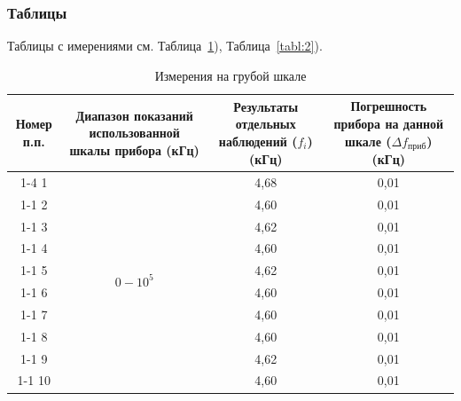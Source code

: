 \subsubsection{Таблицы}
Таблицы с имерениями см. Таблица~\ref{tabl:1}), Таблица~\ref{tabl:2}).

\begin{table}[ht!]
\centering
\caption{Измерения на грубой шкале}
\label{tabl:1}
\begin{tabular}{|c|c|c|c|}
\hline
\begin{minipage}{3cm}
    Номер п.п.
\end{minipage} &
\begin{minipage}{4cm}
    Диапазон показаний использованной шкалы прибора (кГц)
\end{minipage} &
\begin{minipage}{4cm}
    Результаты отдельных наблюдений ($f_i$) (кГц)
\end{minipage} &
\begin{minipage}{4cm}
    Погрешность прибора на данной шкале ($\Delta f_{\text{приб}}$) (кГц)
\end{minipage} \\ \cline{1-4}
1  & \multirow{10}{*}{$0 - 10^5$} & 4,68 & 0,01 \\ \cline{1-1} \cline{3-4}
2  & & 4,60 & 0,01 \\ \cline{1-1} \cline{3-4}
3  & & 4,62 & 0,01 \\ \cline{1-1} \cline{3-4}
4  & & 4,60 & 0,01 \\ \cline{1-1} \cline{3-4}
5  & & 4,62 & 0,01 \\ \cline{1-1} \cline{3-4}
6  & & 4,60 & 0,01 \\ \cline{1-1} \cline{3-4}
7  & & 4,60 & 0,01 \\ \cline{1-1} \cline{3-4}
8  & & 4,60 & 0,01 \\ \cline{1-1} \cline{3-4}
9  & & 4,62 & 0,01 \\ \cline{1-1} \cline{3-4}
10 & & 4,60 & 0,01 \\ \hline
\end{tabular}
\end{table}

